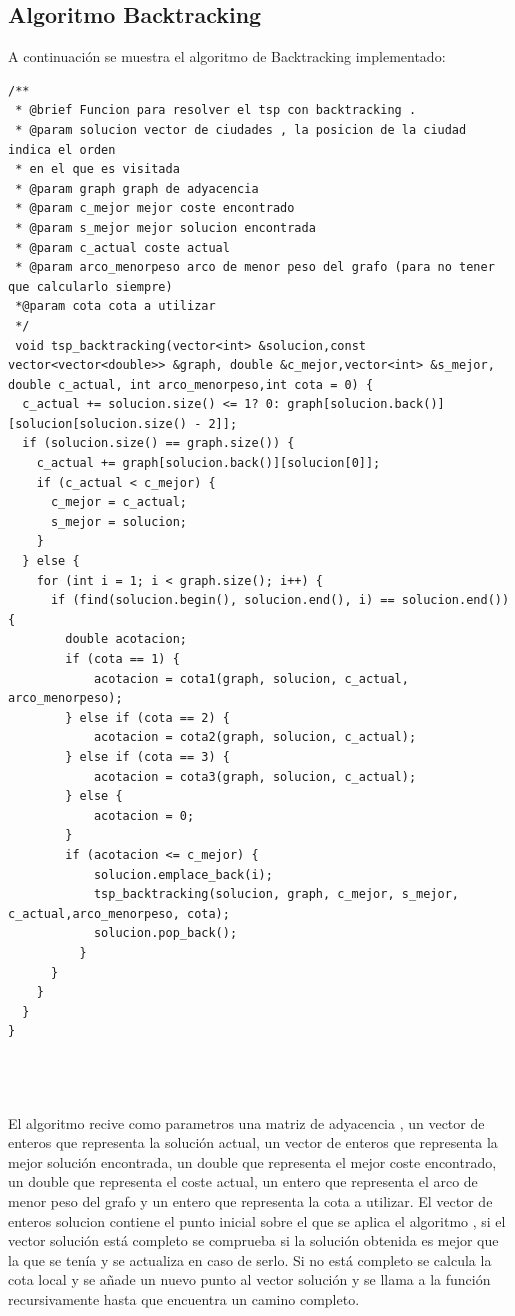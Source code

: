 \documentclass[11pt,openany]{book}
\begin{document}
\subsection{Algoritmo Backtracking}
A continuación se muestra el algoritmo de Backtracking implementado:

\begin{lstlisting}
/**
 * @brief Funcion para resolver el tsp con backtracking .
 * @param solucion vector de ciudades , la posicion de la ciudad indica el orden
 * en el que es visitada
 * @param graph graph de adyacencia
 * @param c_mejor mejor coste encontrado
 * @param s_mejor mejor solucion encontrada
 * @param c_actual coste actual
 * @param arco_menorpeso arco de menor peso del grafo (para no tener que calcularlo siempre)
 *@param cota cota a utilizar
 */
 void tsp_backtracking(vector<int> &solucion,const vector<vector<double>> &graph, double &c_mejor,vector<int> &s_mejor, double c_actual, int arco_menorpeso,int cota = 0) {
  c_actual += solucion.size() <= 1? 0: graph[solucion.back()][solucion[solucion.size() - 2]];
  if (solucion.size() == graph.size()) {
    c_actual += graph[solucion.back()][solucion[0]];
    if (c_actual < c_mejor) {
      c_mejor = c_actual;
      s_mejor = solucion;
    }
  } else {
    for (int i = 1; i < graph.size(); i++) {
      if (find(solucion.begin(), solucion.end(), i) == solucion.end()) {
        double acotacion;
        if (cota == 1) {
            acotacion = cota1(graph, solucion, c_actual, arco_menorpeso);
        } else if (cota == 2) {
            acotacion = cota2(graph, solucion, c_actual);
        } else if (cota == 3) {
            acotacion = cota3(graph, solucion, c_actual);
        } else {
            acotacion = 0;
        }
        if (acotacion <= c_mejor) {
            solucion.emplace_back(i);
            tsp_backtracking(solucion, graph, c_mejor, s_mejor, c_actual,arco_menorpeso, cota);
            solucion.pop_back();
          }
      }
    }
  }
}

  
                
    \end{lstlisting}
    El algoritmo recive como parametros una matriz de adyacencia , un vector de enteros que representa la solución actual, un vector de enteros que representa la mejor solución encontrada, un double que representa el mejor coste encontrado, un double que representa el coste actual, un entero que representa el arco de menor peso del grafo y un entero que representa la cota a utilizar.
    El vector de enteros solucion contiene el punto inicial sobre el que se aplica el algoritmo , si el vector solución está completo se comprueba si 
    la solución obtenida es mejor que la que se tenía y se actualiza en caso de serlo. Si no está completo se calcula la cota local y se  añade un nuevo punto al vector solución y se llama a la función recursivamente hasta que encuentra un camino completo.
    
\end{document}
